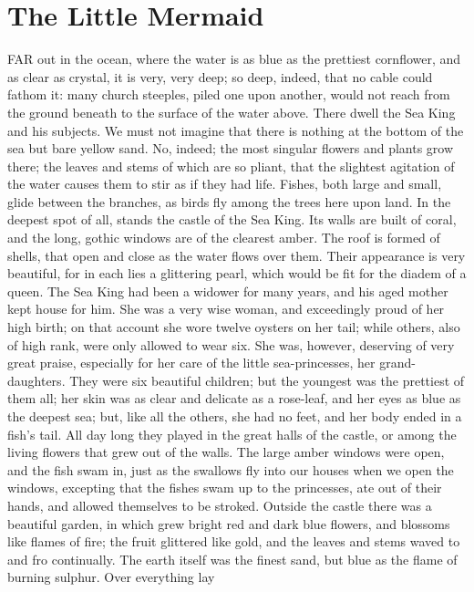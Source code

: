 \chapter{The Little Mermaid}

    FAR out in the ocean, where the water is as blue as the
prettiest cornflower, and as clear as crystal, it is very, very
deep; so deep, indeed, that no cable could fathom it: many church
steeples, piled one upon another, would not reach from the ground
beneath to the surface of the water above. There dwell the Sea King
and his subjects. We must not imagine that there is nothing at the
bottom of the sea but bare yellow sand. No, indeed; the most
singular flowers and plants grow there; the leaves and stems of
which are so pliant, that the slightest agitation of the water
causes them to stir as if they had life. Fishes, both large and small,
glide between the branches, as birds fly among the trees here upon
land. In the deepest spot of all, stands the castle of the Sea King.
Its walls are built of coral, and the long, gothic windows are of
the clearest amber. The roof is formed of shells, that open and
close as the water flows over them. Their appearance is very
beautiful, for in each lies a glittering pearl, which would be fit for
the diadem of a queen.
    The Sea King had been a widower for many years, and his aged
mother kept house for him. She was a very wise woman, and
exceedingly proud of her high birth; on that account she wore twelve
oysters on her tail; while others, also of high rank, were only
allowed to wear six. She was, however, deserving of very great praise,
especially for her care of the little sea-princesses, her
grand-daughters. They were six beautiful children; but the youngest
was the prettiest of them all; her skin was as clear and delicate as a
rose-leaf, and her eyes as blue as the deepest sea; but, like all
the others, she had no feet, and her body ended in a fish's tail.
All day long they played in the great halls of the castle, or among
the living flowers that grew out of the walls. The large amber windows
were open, and the fish swam in, just as the swallows fly into our
houses when we open the windows, excepting that the fishes swam up
to the princesses, ate out of their hands, and allowed themselves to
be stroked. Outside the castle there was a beautiful garden, in
which grew bright red and dark blue flowers, and blossoms like
flames of fire; the fruit glittered like gold, and the leaves and
stems waved to and fro continually. The earth itself was the finest
sand, but blue as the flame of burning sulphur. Over everything lay
